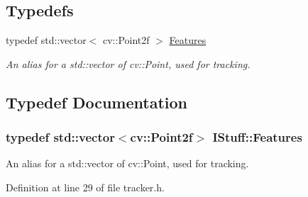 \subsection*{Typedefs}
\begin{DoxyCompactItemize}
\item 
typedef std\-::vector$<$ cv\-::\-Point2f $>$ \hyperlink{namespace_i_stuff_a2d680b8d3ea1fa53d1aa740cc669063c}{Features}
\begin{DoxyCompactList}\small\item\em An alias for a std\-::vector of cv\-::\-Point, used for tracking. \end{DoxyCompactList}\end{DoxyCompactItemize}


\subsection{Typedef Documentation}
\hypertarget{namespace_i_stuff_a2d680b8d3ea1fa53d1aa740cc669063c}{
\subsubsection[{Features}]{\setlength{\rightskip}{0pt plus 5cm}typedef std\-::vector$<$cv\-::\-Point2f$>$ {\bf I\-Stuff\-::\-Features}}}\label{namespace_i_stuff_a2d680b8d3ea1fa53d1aa740cc669063c}


An alias for a std\-::vector of cv\-::\-Point, used for tracking. 



Definition at line 29 of file tracker.\-h.

